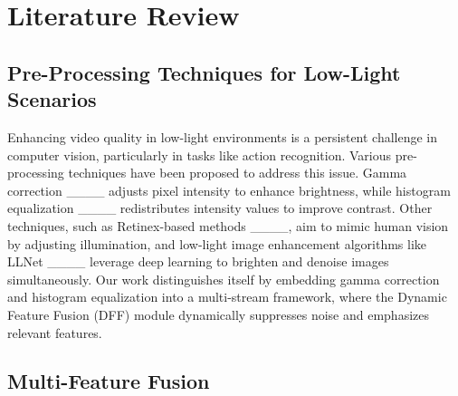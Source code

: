 \section{Literature Review}
\subsection{Pre-Processing Techniques for Low-Light Scenarios}

Enhancing video quality in low-light environments is a persistent challenge in computer vision, particularly in tasks like action recognition. Various pre-processing techniques have been proposed to address this issue. Gamma correction ____ adjusts pixel intensity to enhance brightness, while histogram equalization ____ redistributes intensity values to improve contrast. Other techniques, such as Retinex-based methods ____, aim to mimic human vision by adjusting illumination, and low-light image enhancement algorithms like LLNet ____ leverage deep learning to brighten and denoise images simultaneously. %
Our work distinguishes itself by embedding gamma correction and histogram equalization into a multi-stream framework, where the Dynamic Feature Fusion (DFF) module dynamically suppresses noise and emphasizes relevant features. 

\subsection{Multi-Feature Fusion}

